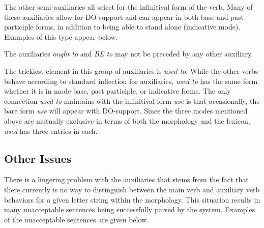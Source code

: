 The other semi-auxiliaries all select for the infinitival form of the verb. 
Many of these auxiliaries allow for DO-support and can appear in both base and 
past participle forms, in addition to being able to stand alone (indicative 
mode).  Examples of this type appear below. 
 
\beginsentences
{}\label{ex:31} 
\label{ex:32} 
\label{ex:33} 
\label{ex:34} 
\label{ex:35} 
\label{ex:36} 
\endsentences

 
The auxiliaries {\it ought to} and {\it BE to} may not be preceded by any other 
auxiliary.  
 
\beginsentences
{}\label{ex:37} 
\label{ex:38} 
\label{ex:39} 
\label{ex:40} 
\endsentences

 
The trickiest element in this group of auxiliaries is {\it used to}.  While the 
other verbs behave according to standard inflection for auxiliaries, {\it used to} has the same form whether it is in mode base, past participle, or 
indicative forms.  The only connection {\it used to} maintains with the 
infinitival form {\it use} is that occasionally, the bare form {\it use} will 
appear with DO-support.  Since the three modes mentioned above are mutually 
exclusive in terms of both the morphology and the lexicon, {\it used} has three 
entries in each.  
 
\subsection{Other Issues} 
 
There is a lingering problem with the auxiliaries that stems from the fact that 
there currently is no way to distinguish between the main verb and auxiliary verb 
behaviors for a given letter string within the morphology.  This situation 
results in many unacceptable sentences being successfully parsed by the system. 
Examples of the unacceptable sentences are given below. 
 
\beginsentences
{}\label{ex:41} 
\label{ex:42} 
\label{ex:43} 
\label{ex:44} 
\label{ex:45} 
\endsentences

 
 
 
 
        
 
 
 
 
